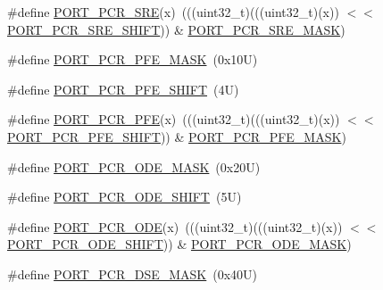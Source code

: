 \begin{DoxyCompactItemize}
\#define \mbox{\hyperlink{group___p_o_r_t___register___masks_ga0b115d46762f17530e67c2caeeca89b7}{P\+O\+R\+T\+\_\+\+P\+C\+R\+\_\+\+S\+RE}}(x)~(((uint32\+\_\+t)(((uint32\+\_\+t)(x)) $<$$<$ \mbox{\hyperlink{group___p_o_r_t___register___masks_ga87657ecdc18eb5b344d4e399a3a2fb70}{P\+O\+R\+T\+\_\+\+P\+C\+R\+\_\+\+S\+R\+E\+\_\+\+S\+H\+I\+FT}})) \& \mbox{\hyperlink{group___p_o_r_t___register___masks_ga9cdf02a7b160ee528de8e18aad2cae60}{P\+O\+R\+T\+\_\+\+P\+C\+R\+\_\+\+S\+R\+E\+\_\+\+M\+A\+SK}})
\item 
\#define \mbox{\hyperlink{group___p_o_r_t___register___masks_ga7f1f5c3812018f9ed4d84a187146ba91}{P\+O\+R\+T\+\_\+\+P\+C\+R\+\_\+\+P\+F\+E\+\_\+\+M\+A\+SK}}~(0x10\+U)
\item 
\#define \mbox{\hyperlink{group___p_o_r_t___register___masks_gae7d057ebd3218784fca57f55a85f2d29}{P\+O\+R\+T\+\_\+\+P\+C\+R\+\_\+\+P\+F\+E\+\_\+\+S\+H\+I\+FT}}~(4\+U)
\item 
\#define \mbox{\hyperlink{group___p_o_r_t___register___masks_ga6aaad9480435ab627b88723f45b5c133}{P\+O\+R\+T\+\_\+\+P\+C\+R\+\_\+\+P\+FE}}(x)~(((uint32\+\_\+t)(((uint32\+\_\+t)(x)) $<$$<$ \mbox{\hyperlink{group___p_o_r_t___register___masks_gae7d057ebd3218784fca57f55a85f2d29}{P\+O\+R\+T\+\_\+\+P\+C\+R\+\_\+\+P\+F\+E\+\_\+\+S\+H\+I\+FT}})) \& \mbox{\hyperlink{group___p_o_r_t___register___masks_ga7f1f5c3812018f9ed4d84a187146ba91}{P\+O\+R\+T\+\_\+\+P\+C\+R\+\_\+\+P\+F\+E\+\_\+\+M\+A\+SK}})
\item 
\#define \mbox{\hyperlink{group___p_o_r_t___register___masks_gacbe19f0087a51a8c26c51838b7a555d2}{P\+O\+R\+T\+\_\+\+P\+C\+R\+\_\+\+O\+D\+E\+\_\+\+M\+A\+SK}}~(0x20\+U)
\item 
\#define \mbox{\hyperlink{group___p_o_r_t___register___masks_gac4871a3c3a20a51a3a57131d34e427e0}{P\+O\+R\+T\+\_\+\+P\+C\+R\+\_\+\+O\+D\+E\+\_\+\+S\+H\+I\+FT}}~(5\+U)
\item 
\#define \mbox{\hyperlink{group___p_o_r_t___register___masks_ga098fe406e2291f75306796cba6723c64}{P\+O\+R\+T\+\_\+\+P\+C\+R\+\_\+\+O\+DE}}(x)~(((uint32\+\_\+t)(((uint32\+\_\+t)(x)) $<$$<$ \mbox{\hyperlink{group___p_o_r_t___register___masks_gac4871a3c3a20a51a3a57131d34e427e0}{P\+O\+R\+T\+\_\+\+P\+C\+R\+\_\+\+O\+D\+E\+\_\+\+S\+H\+I\+FT}})) \& \mbox{\hyperlink{group___p_o_r_t___register___masks_gacbe19f0087a51a8c26c51838b7a555d2}{P\+O\+R\+T\+\_\+\+P\+C\+R\+\_\+\+O\+D\+E\+\_\+\+M\+A\+SK}})
\item 
\#define \mbox{\hyperlink{group___p_o_r_t___register___masks_gae1c37b9f66e58bd80e7764232fd05cee}{P\+O\+R\+T\+\_\+\+P\+C\+R\+\_\+\+D\+S\+E\+\_\+\+M\+A\+SK}}~(0x40\+U)
$$
\end{DoxyCompactItemize}

